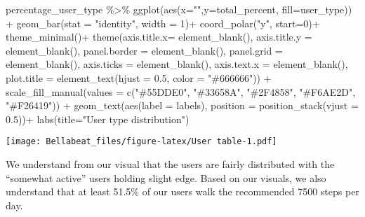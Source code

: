 \documentclass[
]{article}
\newenvironment{Shaded}{\begin{snugshade}}{\end{snugshade}}
\newcommand{\AttributeTok}[1]{\textcolor[rgb]{0.77,0.63,0.00}{#1}}
\newcommand{\DecValTok}[1]{\textcolor[rgb]{0.00,0.00,0.81}{#1}}
\newcommand{\FloatTok}[1]{\textcolor[rgb]{0.00,0.00,0.81}{#1}}
\newcommand{\FunctionTok}[1]{\textcolor[rgb]{0.00,0.00,0.00}{#1}}
\newcommand{\NormalTok}[1]{#1}
\newcommand{\SpecialCharTok}[1]{\textcolor[rgb]{0.00,0.00,0.00}{#1}}
\newcommand{\StringTok}[1]{\textcolor[rgb]{0.31,0.60,0.02}{#1}}
\begin{document}
\begin{Shaded}
\begin{Highlighting}[]
\NormalTok{percentage\_user\_type }\SpecialCharTok{\%\textgreater{}\%}
  \FunctionTok{ggplot}\NormalTok{(}\FunctionTok{aes}\NormalTok{(}\AttributeTok{x=}\StringTok{""}\NormalTok{,}\AttributeTok{y=}\NormalTok{total\_percent, }\AttributeTok{fill=}\NormalTok{user\_type)) }\SpecialCharTok{+}
  \FunctionTok{geom\_bar}\NormalTok{(}\AttributeTok{stat =} \StringTok{"identity"}\NormalTok{, }\AttributeTok{width =} \DecValTok{1}\NormalTok{)}\SpecialCharTok{+}
  \FunctionTok{coord\_polar}\NormalTok{(}\StringTok{"y"}\NormalTok{, }\AttributeTok{start=}\DecValTok{0}\NormalTok{)}\SpecialCharTok{+}
  \FunctionTok{theme\_minimal}\NormalTok{()}\SpecialCharTok{+}
  \FunctionTok{theme}\NormalTok{(}\AttributeTok{axis.title.x=} \FunctionTok{element\_blank}\NormalTok{(),}
        \AttributeTok{axis.title.y =} \FunctionTok{element\_blank}\NormalTok{(),}
        \AttributeTok{panel.border =} \FunctionTok{element\_blank}\NormalTok{(), }
        \AttributeTok{panel.grid =} \FunctionTok{element\_blank}\NormalTok{(), }
        \AttributeTok{axis.ticks =} \FunctionTok{element\_blank}\NormalTok{(),}
        \AttributeTok{axis.text.x =} \FunctionTok{element\_blank}\NormalTok{(),}
        \AttributeTok{plot.title =} \FunctionTok{element\_text}\NormalTok{(}\AttributeTok{hjust =} \FloatTok{0.5}\NormalTok{, }\AttributeTok{color =} \StringTok{"\#666666"}\NormalTok{)) }\SpecialCharTok{+}
  \FunctionTok{scale\_fill\_manual}\NormalTok{(}\AttributeTok{values =} \FunctionTok{c}\NormalTok{(}\StringTok{"\#55DDE0"}\NormalTok{, }\StringTok{"\#33658A"}\NormalTok{, }\StringTok{"\#2F4858"}\NormalTok{, }\StringTok{"\#F6AE2D"}\NormalTok{, }\StringTok{"\#F26419"}\NormalTok{)) }\SpecialCharTok{+}
  \FunctionTok{geom\_text}\NormalTok{(}\FunctionTok{aes}\NormalTok{(}\AttributeTok{label =}\NormalTok{ labels),}
            \AttributeTok{position =} \FunctionTok{position\_stack}\NormalTok{(}\AttributeTok{vjust =} \FloatTok{0.5}\NormalTok{))}\SpecialCharTok{+}
  \FunctionTok{labs}\NormalTok{(}\AttributeTok{title=}\StringTok{"User type distribution"}\NormalTok{)}
\end{Highlighting}
\end{Shaded}

\texttt{[image: Bellabeat\_files/figure-latex/User table-1.pdf]}

We understand from our visual that the users are fairly distributed with
the ``somewhat active'' users holding slight edge. Based on our visuals,
we also understand that at least 51.5\% of our users walk the
recommended 7500 steps per day.
\end{document}
